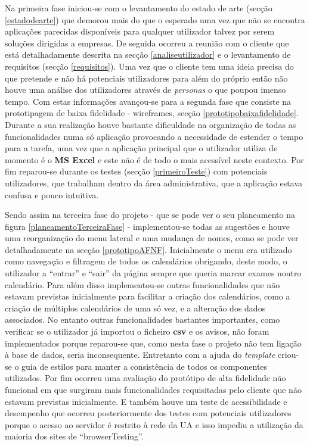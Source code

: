 \documentclass[11pt, twoside]{report}
\begin{document}
 	Na primeira fase iniciou-se com o levantamento do estado de arte (secção \ref{estadodearte}) que demorou mais do que o esperado uma vez que não se encontra aplicações parecidas disponíveis para qualquer utilizador talvez por serem soluções dirigidas a empresas.
 	De seguida ocorreu a reunião com o cliente que está detalhadamente descrita na secção \ref{analiseutilizador} e o levantamento de requisitos (secção \ref{requisitos}).
 	Uma vez que o cliente tem uma ideia precisa do que pretende e não há potenciais utilizadores para além do próprio então não houve uma análise dos utilizadores através de \textit{personas} o que poupou imenso tempo.
 	Com estas informações  avançou-se para a segunda fase que consiste na prototipagem de baixa fidelidade - wireframes, secção \ref{prototipobaixafidelidade}.
 	Durante a sua realização houve bastante dificuldade na organização de todas as funcionalidades numa só aplicação provocando a necessidade de estender o tempo para a tarefa, uma vez que a aplicação principal que o utilizador utiliza de momento é o \textbf{MS Excel} e este não é de todo o mais acessível neste contexto.
 	Por fim reparou-se durante os testes (secção \ref{primeiroTeste}) com potenciais utilizadores, que trabalham dentro da área administrativa, que a aplicação estava confusa e pouco intuitiva.
 	
 	Sendo assim na terceira fase do projeto - que se pode ver o seu planeamento na figura \ref{planeamentoTerceiraFase} - implementou-se todas as sugestões e houve uma reorganização do menu lateral e uma mudança de nomes, como se pode ver detalhadamente na secção \ref{prototipoAFNF}.
 	Inicialmente o menu era utilizado como navegação e filtragem de todos os calendários obrigando, deste modo, o utilizador a ``entrar'' e ``sair'' da página sempre que queria marcar exames noutro calendário.
 	Para além disso implementou-se outras funcionalidades que não estavam previstas inicialmente para facilitar a criação dos calendários, como a criação de múltiplos calendários de uma só vez, e a alteração dos dados associados.
 	No entanto outras funcionalidades bastantes importantes, como verificar se o utilizador já importou o ficheiro \textbf{csv} e os avisos, não foram implementados porque reparou-se que, como nesta fase o projeto não tem ligação à base de dados, seria inconsequente.
 	Entretanto com a ajuda do \textit{template} criou-se o guia de estilos para manter a consistência de todos os componentes utilizados.
 	Por fim ocorreu uma avaliação do protótipo de alta fidelidade não funcional em que surgiram mais funcionalidades requisitadas pelo cliente que não estavam previstas inicialmente.
 	E também houve um teste de acessibilidade e desempenho que ocorreu posteriormente dos testes com potenciais utilizadores porque o acesso ao servidor é restrito à rede da UA e isso impediu a utilização da maioria dos sites de ``browserTesting''. 
\end{document}
